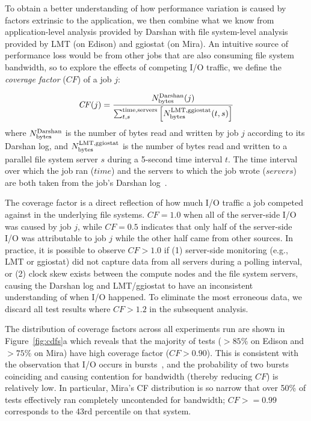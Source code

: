 To obtain a better understanding of how performance variation is caused by factors extrinsic to the application, we then combine what we know from application-level analysis provided by Darshan with file system-level analysis provided by LMT (on Edison) and ggiostat (on Mira).  An intuitive source of performance loss would be from other jobs that are also consuming file system bandwidth, so to explore the effects of competing I/O traffic, we define the \emph{coverage factor} ($\mathit{CF}$) of a job $j$:

\begin{equation} \label{eq:cf}
    \mathit{CF}(j) = \frac{N_{\textup{bytes}}^{\textup{Darshan}}(j)}
    {\sum_{t,s}^{\textup{time,servers}}
    \left [ N_{\textup{bytes}}^{\textup{LMT,ggiostat}}(t,s) \right ] }
\end{equation}
%
where $N_{\textup{bytes}}^{\textup{Darshan}}$ is the number of bytes read and written by job $j$ according to its Darshan log, and $N_{\textup{bytes}}^{\textup{LMT,ggiostat}}$ is the number of bytes read and written to a parallel file system server $s$ during a 5-second time interval $t$.
The time interval over which the job ran ($\mathit{time}$) and the servers to which the job wrote ($\mathit{servers}$) are both taken from the job's Darshan log~\cite{snyder2016modular}.

The coverage factor is a direct reflection of how much I/O traffic a job
competed against in the underlying file systems.  $CF = 1.0$ when
all of the server-side I/O was caused by job $j$, while $CF = 0.5$ indicates that only half of the server-side I/O was attributable to job $j$ while the other half came from other sources.
In practice, it is possible to observe $CF > 1.0$ 
if (1) server-side monitoring (e.g., LMT or ggiostat)
did not capture data from all servers during a polling interval, or (2) clock skew exists between the compute nodes and the file system servers, causing the Darshan log and LMT/ggiostat to have an inconsistent understanding of when I/O happened.
To eliminate the most erroneous data, we discard all test results where $CF > 1.2$ in the subsequent analysis.

The distribution of coverage factors across all experiments run are shown in
Figure~\ref{fig:cdfs}a which reveals that the majority of tests
($> 85\%$ on Edison and $> 75\%$ on Mira) have high coverage factor
($CF > 0.90$).  This is consistent with the observation that I/O occurs in
bursts~\cite{Carns2011,Liu2016}, and the probability of two bursts coinciding
and causing contention for bandwidth (thereby reducing $CF$) is relatively low.
In particular, Mira's CF distribution is so narrow that over 50\% of tests effectively ran completely uncontended for bandwidth; $\textit{CF} >= 0.99$ corresponds to the 43rd percentile on that system.


